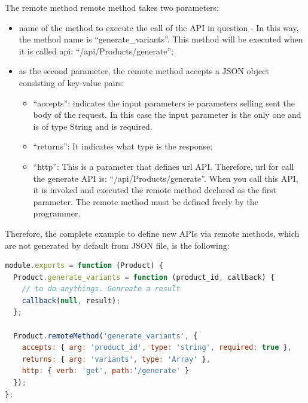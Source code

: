 The remote method remote method takes two parameters:
\begin{itemize}
\item name of the method to execute the call of the API in question - In this way, the method name is “generate\_variants”. This method will be executed when it is called api: “/api/Products/generate”;
\item as the second parameter, the remote method accepts a JSON object consisting of key-value pairs:
\begin{itemize}
\item “accepts”: indicates the input parameters ie parameters selling sent the body of the request. In this case the input parameter is the only one and is of type String and is required.
\item “returns”: It indicates what type is the response;
\item “http”: This is a parameter that defines url API. Therefore, url for call the generate API is: “/api/Products/generate”. When you call this API, it is invoked and executed the remote method declared as the first parameter. The remote method must be defined freely by the programmer.
\end{itemize}
\end{itemize}
Therefore, the complete example to define new APIs via remote methods, which are not generated by default from JSON file, is the following:
\begin{lstlisting}[language=javascript]
module.exports = function (Product) {
  Product.generate_variants = function (product_id, callback) {
    // to do anythings. Genreate a result
    callback(null, result);
  };

  Product.remoteMethod('generate_variants', {
    accepts: { arg: 'product_id', type: 'string', required: true },
    returns: { arg: 'variants', type: 'Array' },
    http: { verb: 'get', path:'/generate' }
  });
};
\end{lstlisting}
